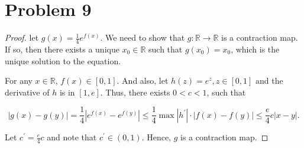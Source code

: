 \documentclass[12pt]{article}
\begin{document}
\section*{Problem 9}

\begin{proof}

let $g(x) = \frac{1}{4} e^{f(x)}$. We need to show that $g: \mathbb{R} \rightarrow \mathbb{R}$ is a contraction map. If so, then there exists a unique $x_0\in\mathbb{R}$ such that $g(x_0) = x_0$, which is the unique solution to the equation.

For any $x\in \mathbb{R}$, $f(x) \in [0, 1]$. And also, let $h(z) = e^z, z\in [0, 1]$ and the derivative of $h$ is in $[1, e]$. Thus, there exists $0<c<1$, such that

$$
|g(x) - g(y)| = \frac{1}{4}|e^{f(x)} - e^{f(y)}| \leqslant \frac{1}{4}\max |h^\prime|\cdot |f(x) - f(y)| \leqslant \frac{e}{4}c|x-y|.
$$

Let $c^\prime = \frac{e}{4}c$ and note that $c^\prime \in (0, 1)$. Hence, $g$ is a contraction map.


\end{proof}
\end{document}
